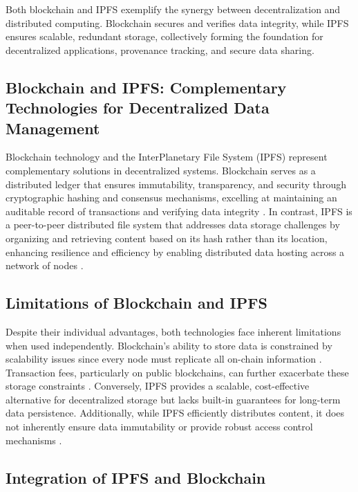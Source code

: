 \documentclass{article}
\begin{document}
Both blockchain and IPFS exemplify the synergy between decentralization and distributed computing. Blockchain secures and verifies data integrity, while IPFS ensures scalable, redundant storage, collectively forming the foundation for decentralized applications, provenance tracking, and secure data sharing.

\subsection{Blockchain and IPFS: Complementary Technologies for Decentralized Data Management}

Blockchain technology and the InterPlanetary File System (IPFS) represent complementary solutions in decentralized systems. Blockchain serves as a distributed ledger that ensures immutability, transparency, and security through cryptographic hashing and consensus mechanisms, excelling at maintaining an auditable record of transactions and verifying data integrity \cite{nakamoto2008bitcoin}. In contrast, IPFS is a peer-to-peer distributed file system that addresses data storage challenges by organizing and retrieving content based on its hash rather than its location, enhancing resilience and efficiency by enabling distributed data hosting across a network of nodes \cite{benet2014ipfs}.

\subsection{Limitations of Blockchain and IPFS}

Despite their individual advantages, both technologies face inherent limitations when used independently. Blockchain's ability to store data is constrained by scalability issues since every node must replicate all on-chain information \cite{steichen2018}. Transaction fees, particularly on public blockchains, can further exacerbate these storage constraints \cite{easley_mining_2019}. Conversely, IPFS provides a scalable, cost-effective alternative for decentralized storage  \cite{benet2014ipfs} but lacks built-in guarantees for long-term data persistence. Additionally, while IPFS efficiently distributes content, it does not inherently ensure data immutability or provide robust access control mechanisms \cite{steichen2018}.

\subsection{Integration of IPFS and Blockchain}
\end{document}
